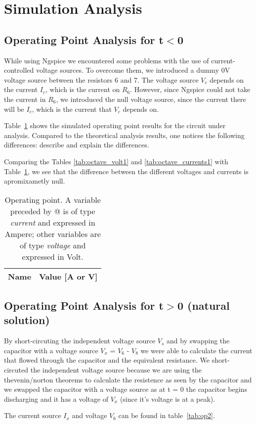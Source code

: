 \section{Simulation Analysis}
\label{sec:simulation}

\subsection{Operating Point Analysis for t$<$0}
\label{subsec:op_analysis}

\tab While using Ngspice we encountered some problems with the use of current-controlled voltage sources. To overcome them, we introduced a dummy 0V voltage source between the resistors 6 and 7.
The voltage source $V_c$ depends on the current $I_c$, which is the current on $R_6$. However, since Ngspice could not take the current in $R_6$, we introduced the null voltage source, since the current there will be $I_c$, which is the current that $V_c$ depends on.

Table~\ref{tab:op} shows the simulated operating point results for the circuit
under analysis. Compared to the theoretical analysis results, one notices the
following differences: describe and explain the differences.

Comparing the Tables \ref{tab:octave_volt1} and \ref{tab:octave_currents1} with Table~\ref{tab:op}, we see that the difference between the different voltages and currents is apromixametly null.\par
\begin{table}[H]
  \centering
  \begin{tabular}{|l|r|}
    \hline    
    {\bf Name} & {\bf Value [A or V]} \\ \hline
    
  \end{tabular}
  \caption{Operating point. A variable preceded by @ is of type {\em current}
    and expressed in Ampere; other variables are of type {\it voltage} and expressed in
    Volt.}
  \label{tab:op}
\end{table}

\subsection{Operating Point Analysis for t$>$0 (natural solution)}
\tab By short-circuting the independent voltage source $V_s$ and by swapping the capacitor with a voltage source $V_x$ = $V_6$ - $V_8$ we were able to calculate the current that flowed through the capacitor and the equivalent resistance. We short-circuted the independent voltage source because we are using the thevenin/norton theorems to calculate the resistence as seen by the capacitor and we swapped the capacitor with a voltage source as at t = 0 the capacitor begins discharging and it has a voltage of $V_x$ (since it's voltage is at a peak).\par
The current source $I_x$ and voltage $V_6$ can be found in table~\ref{tab:op2}.


